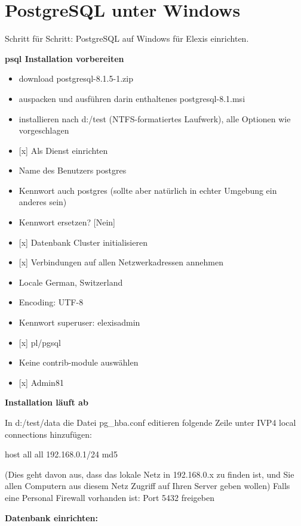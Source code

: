 \section{PostgreSQL unter Windows}
Schritt für Schritt: PostgreSQL auf Windows für Elexis einrichten.


\textbf{psql Installation vorbereiten}

\begin{itemize}
\item download postgresql-8.1.5-1.zip
\item auspacken und ausführen darin enthaltenes postgresql-8.1.msi
\item installieren nach d:{/}test (NTFS-formatiertes Laufwerk), alle Optionen wie vorgeschlagen
\item  {[x]} Als Dienst einrichten
\item  Name des Benutzers postgres
\item  Kennwort auch postgres (sollte aber natürlich in echter Umgebung ein anderes sein)
\item  Kennwort ersetzen? {[}Nein{]}
\item  {[x]} Datenbank Cluster initialisieren
\item  {[x]} Verbindungen auf allen Netzwerkadressen annehmen
\item  Locale German, Switzerland
\item  Encoding: UTF-8
\item  Kennwort superuser: elexisadmin
\item  {[x]} pl/pgsql
\item  Keine contrib-module auswählen
\item  {[x]} Admin81
\end{itemize}

\textbf{Installation läuft ab}

In d:/test/data die Datei pg\_hba.conf editieren
folgende Zeile unter IVP4 local connections hinzufügen:


host all all 192.168.0.1/24 md5


(Dies geht davon aus, dass das lokale Netz in 192.168.0.x zu finden ist, und Sie allen Computern aus diesem Netz Zugriff auf Ihren Server geben wollen)
Falls eine Personal Firewall vorhanden ist: Port 5432 freigeben



\textbf{Datenbank einrichten:}

